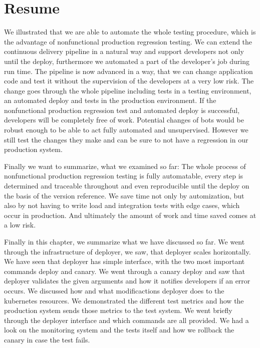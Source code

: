 \section{Resume}

We illustrated that we are able to automate the whole testing procedure, which is the
advantage of nonfunctional production regression testing. We can extend the continuous
delivery pipeline in a natural way and support developers not only until the deploy,
furthermore we automated a part of the developer's job during run time. The pipeline is
now advanced in a way, that we can change application code and test it without the
supervision of the developers at a very low risk. The change goes through the whole
pipeline including tests in a testing environment, an automated deploy and tests in the
production environment. If the nonfunctional production regression test and automated
deploy is successful, developers will be completely free of work. Potential changes of
bots would be robust enough to be able to act fully automated and unsupervised. However we
still test the changes they make and can be sure to not have a regression in our
production system.

Finally we want to summarize, what we examined so far: The whole process of nonfunctional
production regression testing is fully automatable, every step is determined and traceable
throughout and even reproducible until the deploy on the basis of the version
reference. We save time not only by automization, but also by not having to write load and
integration tests with edge cases, which occur in production. And ultimately the amount of
work and time saved comes at a low risk.



Finally in this chapter, we summarize what we have discussed so far. We went through the
infrastructure of deployer, we saw, that deployer scales horizontally. We have seen that
deployer has simple interface, with the two most important commands deploy and canary. We
went through a canary deploy and saw that deployer validates the given arguments and how
it notifies developers if an error occurs. We discussed how and what modificactions
deployer does to the kubernetes resources. We demonstrated the different test metrics and
how the production system sends those metrics to the test system. We went briefly through
the deployer interface and which commands are all provided. We had a look on the
monitoring system and the tests itself and how we rollback the canary in case the test
fails.


